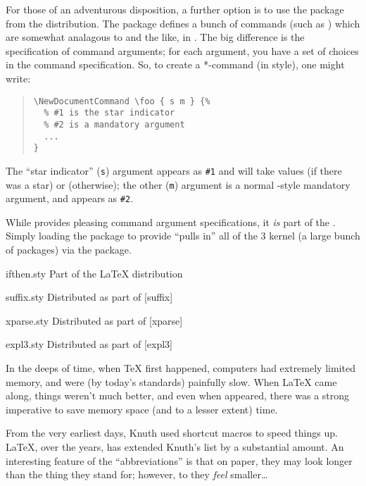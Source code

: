 For those of an adventurous disposition, a further option is to use
the  package from the 
distribution.  The package defines a bunch of commands (such as
) which are somewhat analagous to
 and the like, in \latexe{}.  The big difference is
the specification of command arguments; for each argument, you have a
set of choices in the command specification.  So, to create a
*-command (in \latexe{} style), one might write:
\begin{quote}
\begin{verbatim}
\NewDocumentCommand \foo { s m } {%
  % #1 is the star indicator
  % #2 is a mandatory argument
  ...
}
\end{verbatim}
\end{quote}
The ``star indicator'' (\texttt{s}) argument appears as \texttt{\#1}
and will take values  (if there was a star) or
 (otherwise); the other (\texttt{m}) argument  is a
normal \tex{}-style mandatory argument, and appears as \texttt{\#2}.

While  provides pleasing command argument
specifications, it \emph{is} part of the %
.
Simply loading the package to provide 
``pulls in'' all of the \latex{}3 kernel (a large bunch of packages)
via the  package.
\begin{ctanrefs}
\item[ifthen.sty]Part of the \LaTeX{} distribution
\item[suffix.sty]Distributed as part of [suffix]
\item[xparse.sty]Distributed as part of [xparse]
\item[expl3.sty]Distributed as part of [expl3]
\end{ctanrefs}


In the deeps of time, when \TeX{} first happened, computers had
extremely limited memory, and were (by today's standards) painfully
slow.  When \LaTeX{} came along, things weren't much better, and even
when \LaTeXe{} appeared, there was a strong imperative to save memory
space (and to a lesser extent)  time.

From the very earliest days, Knuth used shortcut macros to speed
things up.  \LaTeX{}, over the years, has extended Knuth's list by a
substantial amount.  An interesting feature  of the ``abbreviations'' is
that on paper, they may look longer than the thing they stand for;
however, to \AllTeX{} they \emph{feel} smaller\dots{}

